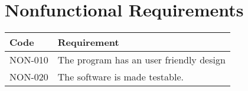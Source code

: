 \chapter{Nonfunctional Requirements}
\begin{tabularx}{\textwidth}{|p{2cm}X|}\hline
Code & Requirement \\\hline
NON-010 & The program has an user friendly design\\\hline
NON-020 & The software is made testable.\\\hline
\end{tabularx}
